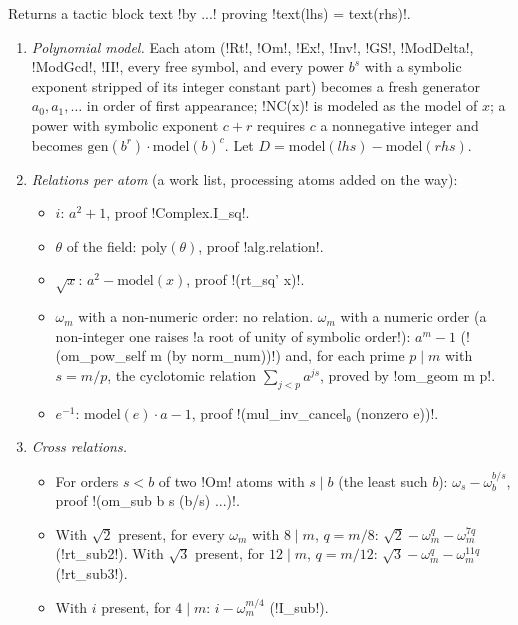 {{{\begin{algorithm}\label{alg:lean-export-prove}
Returns a tactic block text \lexcode!by ...! proving \lexpy!text(lhs) = text(rhs)!.
\begin{enumerate}
\item \emph{Polynomial model.} Each atom (\lexpy!Rt!, \lexpy!Om!, \lexpy!Ex!, \lexpy!Inv!, \lexpy!GS!,
\lexpy!ModDelta!, \lexpy!ModGcd!, \lexpy!II!, every free symbol, and every power $b^{s}$ with a symbolic
exponent stripped of its integer constant part) becomes a fresh generator $a_0, a_1, \ldots$ in
order of first appearance; \lexpy!NC(x)! is modeled as the model of $x$; a power with symbolic
exponent $c+r$ requires $c$ a nonnegative integer and becomes $\mathrm{gen}(b^{r})\cdot
\mathrm{model}(b)^{c}$. Let $D = \mathrm{model}(\mathit{lhs}) - \mathrm{model}(\mathit{rhs})$.
\item \emph{Relations per atom} (a work list, processing atoms added on the way):
\begin{itemize}
\item $i$: $a^2+1$, proof \lexlean!Complex.I_sq!.
\item $\theta$ of the field: $\mathrm{poly}(\theta)$, proof \lexpy!alg.relation!.
\item $\sqrt{x}$: $a^2 - \mathrm{model}(x)$, proof \lexlean!(rt_sq' x)!.
\item $\omega_m$ with a non-numeric order: no relation. $\omega_m$ with a numeric order (a non-integer one raises \lexcode!a root of unity of symbolic order!): $a^m - 1$ (\lexlean!(om_pow_self m (by norm_num))!) and, for each prime $p \mid m$ with
$s=m/p$, the cyclotomic relation $\sum_{j<p} a^{js}$, proved by \lexlean!om_geom m p!.
\item $e^{-1}$: $\mathrm{model}(e)\cdot a - 1$, proof \lexlean!(mul_inv_cancel₀ (nonzero e))!.
\end{itemize}
\item \emph{Cross relations.}
\begin{itemize}
\item For orders $s<b$ of two \lexpy!Om! atoms with $s \mid b$ (the least such $b$):
$\omega_s - \omega_b^{b/s}$, proof \lexlean!(om_sub b s (b/s) ...)!.
\item With $\sqrt2$ present, for every $\omega_m$ with $8\mid m$, $q=m/8$:
$\sqrt2 - \omega_m^{q} - \omega_m^{7q}$ (\lexlean!rt_sub2!). With $\sqrt3$ present, for
$12 \mid m$, $q=m/12$: $\sqrt3 - \omega_m^{q} - \omega_m^{11q}$ (\lexlean!rt_sub3!).
\item With $i$ present, for $4\mid m$: $i - \omega_m^{m/4}$ (\lexlean!I_sub!).

\end{itemize}
\end{enumerate}
\end{algorithm}}}}
